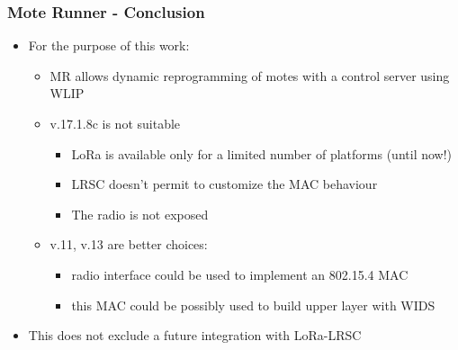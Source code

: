 \begin{frame}[fragile]
  \frametitle{Mote Runner - Conclusion}
  \vspace{-1em}
  \begin{itemize}
    \item For the purpose of this work:
    \begin{itemize}
    	\item MR allows dynamic reprogramming of motes with a control server using WLIP
    	\item v.17.1.8c is not suitable
    	\begin{itemize}
	  \item LoRa is available only for a limited number of platforms (until now!)
	  \item LRSC doesn’t permit to customize the MAC behaviour
	  \item The radio is not exposed
    	\end{itemize}
    	\item v.11, v.13 are better choices:
    	\begin{itemize}
	  \item radio interface could be used to implement an 802.15.4 MAC 
	  \item this MAC could be possibly used to build upper layer with WIDS
    	\end{itemize}
    \end{itemize}
    \item This does not exclude a future integration with LoRa-LRSC
  \end{itemize}
\end{frame}